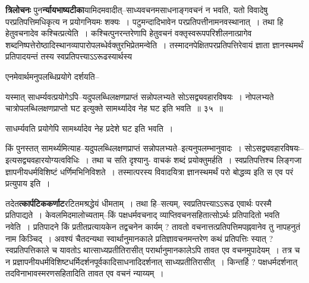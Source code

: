 \documentclass[article,12pt,a4paper]{memoir}
\begin{document}
	  \pstart \textbf{त्रिलोचनः} पुन\textbf{र्न्यायभाष्यटीका}यामिदमवादीत्--साध्यवचनमसाधनाङ्गवचनं न भवति, यतो विवादेषु परप्रतिपत्तिमधिकृत्य न प्रयोगनियमः शक्यः । पटुमन्दादिभावेन परप्रतिपत्तीनामनवस्थानात् । तथा हि हेतुवचनादेव कश्चित्प्रत्येति । कश्चित्पुनरन्तरेणापि हेतुवचनं वक्तृस्वरूपपरिशीलनात्प्रागेव शब्दनिष्पत्तेरोष्ठादिस्थानव्यापारोपलब्धेर्वक्तुरभिप्रेतमन्वेति । तस्मादनपेक्षितपरप्रतिपत्तिरेवायं ज्ञाता ज्ञानस्थमर्थं प्रतिपादयन्तं तस्य स्वप्रतिपत्त्याऽऽरूढस्यार्थस्य \leavevmode{} 
	  
	एनमेवार्थमनुपलब्धिप्रयोगे दर्शयति--  
	  
	यस्मात् साधर्म्यवत्प्रयोगेऽपि--यदुपलब्धिलक्षणप्राप्तं सन्नोपलभ्यते सोऽसद्व्यवहारविषयः । नोपलभ्यते चात्रोपलब्धिलक्षणप्राप्तो घट इत्युक्ते सामर्थ्यादेव नेह घट इति भवति ॥ ३५ ॥ 
	  
	साधर्म्यवति प्रयोगेपि सामर्थ्यादेव नेह प्रदेशे घट इति भवति ।  
	  
	किं पुनस्तत् सामर्थ्यमित्याह--यदुपलब्धिलक्षणप्राप्तं सन्नोपलभ्यते--इत्यनुपलम्भानुवादः । सोऽसद्व्यवहारविषयः--इत्यसद्व्यवहारयोग्यत्वविधिः । तथा च सति दृश्यानु- वाचकं शब्दं प्रयोक्तुमर्हति । स्वप्रतिपत्तिश्च लिङ्गजा ज्ञापनीयधर्मविशिष्टं धर्णिमभिनिविशते । तस्मात्परस्य विवादयित्रा ज्ञानस्थमर्थं परो बोद्धव्य इति स एव परं प्रत्युपाय इति ।
	\pend
      

	  \pstart तदेत\textbf{त्कार्पटिककर्णाट}रटितमश्रद्धेयं धीमताम् । तथा हि--सत्यम्, स्वप्रतिपत्त्याऽऽरूढ एवार्थः परस्मै प्रतिपाद्यते । केवलमिदमालोच्यताम्--किं पक्षधर्मवचनाद् व्याप्तिवचनसहितात्सोऽर्थः प्रतिपादितो भवति नवेति । प्रतिपादने किं प्रतीतप्रत्यायकेन तद्वचनेन कार्यम् ? तावतो वचनात्तत्प्रतिपत्तिमपह्नवानेव  तु नापहनुतं नाम किञ्चिद् । अवश्यं चैतदन्यथा स्वार्थानुमानकाले प्रतिज्ञावचनमन्तरेण कथं प्रतिपत्तिः स्यात् ? स्वप्रतिपत्तिकाले च यावतोऽ थात्साध्यप्रतीतिरासीत् परार्थानुमानकालेऽपि तावत एव वचनमुपादेयम् । तत्र च न प्रज्ञापनीयधर्मविशिष्टधर्मिदर्शनपूर्वकादिसाधनादिदर्शनात् साध्यप्रतीतिरासीत् । किन्तर्हि ? पक्षधर्मदर्शनात् तदविनाभावस्मरणसहितादिति तावत एव वचनं न्याय्यम् ।
	\pend
      
\end{document}
